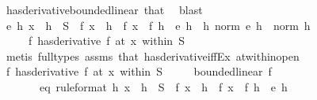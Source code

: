 \begin{isabellebody}
\ has{\isacharunderscore}{\kern0pt}derivative{\isacharunderscore}{\kern0pt}bounded{\isacharunderscore}{\kern0pt}linear\ that\ \isamarkupfalse%
\ blast\isanewline
\ \ \isamarkupfalse%
\ {\isachardoublequoteopen}{\isasymexists}e{\isachardot}{\kern0pt}\ {\isacharparenleft}{\kern0pt}{\isasymforall}h{\isachardot}{\kern0pt}\ x\ {\isacharplus}{\kern0pt}\ h\ {\isasymin}\ S\ {\isasymlongrightarrow}\ f\ {\isacharparenleft}{\kern0pt}x\ {\isacharplus}{\kern0pt}\ h{\isacharparenright}{\kern0pt}\ {\isacharequal}{\kern0pt}\ f\ x\ {\isacharplus}{\kern0pt}\ f{\isacharprime}{\kern0pt}\ h\ {\isacharplus}{\kern0pt}\ e\ h{\isacharparenright}{\kern0pt}\ {\isasymand}\ {\isacharparenleft}{\kern0pt}{\isasymlambda}h{\isachardot}{\kern0pt}\ norm\ {\isacharparenleft}{\kern0pt}e\ h{\isacharparenright}{\kern0pt}\ {\isacharslash}{\kern0pt}\ norm\ h{\isacharparenright}{\kern0pt}\ {\isasymmidarrow}{}{\isasymrightarrow}\ {}{\isachardoublequoteclose}\isanewline
\ \ \ \ \ {\isachardoublequoteopen}{\isacharparenleft}{\kern0pt}f\ has{\isacharunderscore}{\kern0pt}derivative\ f{\isacharprime}{\kern0pt}{\isacharparenright}{\kern0pt}\ {\isacharparenleft}{\kern0pt}at\ x\ within\ S{\isacharparenright}{\kern0pt}{\isachardoublequoteclose}\isanewline
\ \ \ \ \isamarkupfalse%
\ {\isacharparenleft}{\kern0pt}metis\ {\isacharparenleft}{\kern0pt}full{\isacharunderscore}{\kern0pt}types{\isacharparenright}{\kern0pt}\ assms\ that\ has{\isacharunderscore}{\kern0pt}derivative{\isacharunderscore}{\kern0pt}iff{\isacharunderscore}{\kern0pt}Ex\ at{\isacharunderscore}{\kern0pt}within{\isacharunderscore}{\kern0pt}open{\isacharparenright}{\kern0pt}\isanewline
\ \ \isamarkupfalse%
\ {\isachardoublequoteopen}{\isacharparenleft}{\kern0pt}f\ has{\isacharunderscore}{\kern0pt}derivative\ f{\isacharprime}{\kern0pt}{\isacharparenright}{\kern0pt}\ {\isacharparenleft}{\kern0pt}at\ x\ within\ S{\isacharparenright}{\kern0pt}{\isachardoublequoteclose}\isanewline
\ \ \ \ \ {\isachardoublequoteopen}bounded{\isacharunderscore}{\kern0pt}linear\ f{\isacharprime}{\kern0pt}{\isachardoublequoteclose}\isanewline
\ \ \ \ \ \ \ eq\ {\isacharbrackleft}{\kern0pt}rule{\isacharunderscore}{\kern0pt}format{\isacharbrackright}{\kern0pt}{\isacharcolon}{\kern0pt}\ {\isachardoublequoteopen}{\isasymforall}h{\isachardot}{\kern0pt}\ x\ {\isacharplus}{\kern0pt}\ h\ {\isasymin}\ S\ {\isasymlongrightarrow}\ f\ {\isacharparenleft}{\kern0pt}x\ {\isacharplus}{\kern0pt}\ h{\isacharparenright}{\kern0pt}\ {\isacharequal}{\kern0pt}\ f\ x\ {\isacharplus}{\kern0pt}\ f{\isacharprime}{\kern0pt}\ h\ {\isacharplus}{\kern0pt}\ e\ h{\isachardoublequoteclose}\isanewline

\end{isabellebody}
